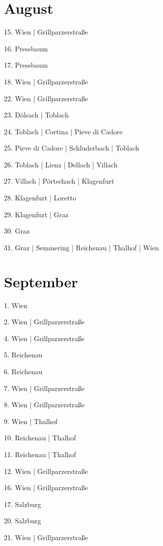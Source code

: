 \documentclass[twoside=false,titlepage=false,open=any, parskip=never, fontsize=10pt, headings=small, chapterprefix=false, appendixprefix=false, DIV=15]{scrbook}
\begin{document}
\begin{multicols}{3}
            \section*{August}
            15. Wien | Grillparzerstraße\par
            16. Pressbaum\par
            17. Pressbaum\par
            18. Wien | Grillparzerstraße\par
            22. Wien | Grillparzerstraße\par
            23. Dölsach | Toblach\par
            24. Toblach | Cortina | Pieve di Cadore\par
            25. Pieve di Cadore | Schluderbach | Toblach\par
            26. Toblach | Lienz | Dellach | Villach\par
            27. Villach | Pörtschach | Klagenfurt\par
            28. Klagenfurt | Loretto\par
            29. Klagenfurt | Graz\par
            30. Graz\par
            31. Graz | Semmering | Reichenau | Thalhof | Wien\par
            \section*{September}
            1. Wien\par
            2. Wien | Grillparzerstraße\par
            4. Wien | Grillparzerstraße\par
            5. Reichenau\par
            6. Reichenau\par
            7. Wien | Grillparzerstraße\par
            8. Wien | Grillparzerstraße\par
            9. Wien | Thalhof\par
            10. Reichenau | Thalhof\par
            11. Reichenau | Thalhof\par
            12. Wien | Grillparzerstraße\par
            16. Wien | Grillparzerstraße\par
            17. Salzburg\par
            20. Salzburg\par
            21. Wien | Grillparzerstraße\par

\end{multicols}
\end{document}
